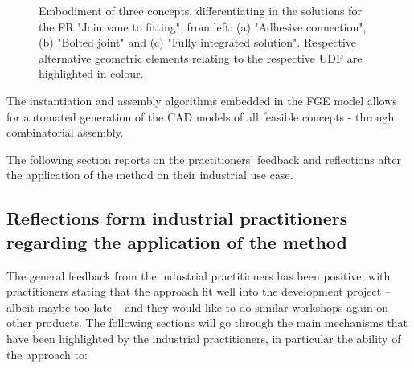\documentclass[preprints,article,accept,moreauthors,pdftex]{Definitions/mdpi}
\newcommand{\Jakob}[1]{{{\color{orange}{\itshape{#1}}\color{black}}
    }{\ignorespaces}}
\begin{document}
\begin{figure}[th!]
\begin{center}
\begin{subfigure}[b]{0.3\textwidth}
            \caption{}
            \label{fig:ogvRender}
        \end{subfigure}
        \caption{Embodiment of three concepts, differentiating in the solutions for the FR "Join vane to fitting", from left: (a) "Adhesive connection", (b) "Bolted joint" and (c) "Fully integrated solution".
        Respective alternative geometric elements relating to the respective UDF are highlighted in colour.}
        \label{fig:altOGV}
    \end{center}
\end{figure}

The instantiation and assembly algorithms embedded in the FGE model allows for automated generation of the CAD models of all feasible concepts - through combinatorial assembly.  

The following section reports on the practitioners' feedback and reflections after the application of the method on their industrial use case. 







\subsection{Reflections form industrial practitioners regarding the application of the method} \label{sec:feedback}

The general feedback from the industrial practitioners has been positive, with practitioners stating that the approach fit well into the development project -- albeit maybe too late -- and they would like to do similar workshops again on other products.
The following sections will go through the main mechanisms that have been highlighted by the industrial practitioners, in particular the ability of the approach to:
\end{document}
